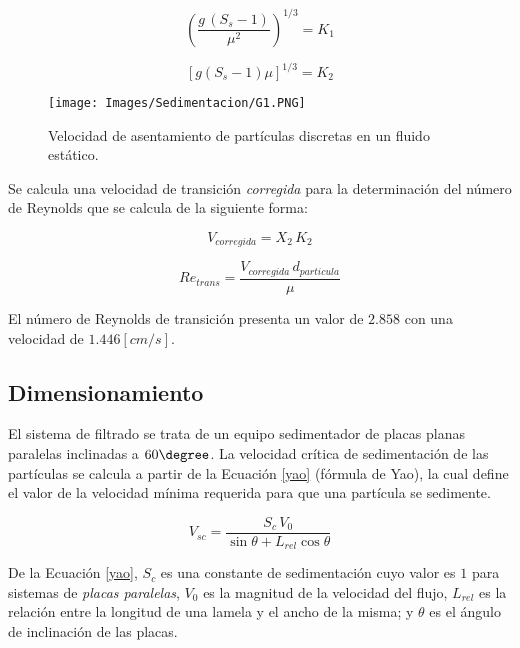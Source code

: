 \begin{equation*}
	\left( \frac{g \, (S_s-1)}{\mu ^2} \right) ^{1/3} = K_1
\end{equation*}

\begin{equation*}
	\left[ g (S_s-1) \mu \right] ^{1/3} = K_2
\end{equation*} 

\begin{figure}[h!]
	\centering
	\texttt{[image: Images/Sedimentacion/G1.PNG]}
	\caption{Velocidad de asentamiento de part\'iculas discretas en un fluido est\'atico.}
	\label{G1}
\end{figure}

\noindent
\justify

Se calcula una velocidad de transici\'on \textit{corregida} para la determinaci\'on del n\'umero de Reynolds que se calcula de la siguiente forma:

\begin{equation*}
	V_{corregida} = X_2 \, K_2
\end{equation*}

\begin{equation}
	Re_{trans} = \frac{V_{corregida} \, d_{particula}}{\mu}
\end{equation}

\noindent
\justify

El n\'umero de Reynolds de transici\'on presenta un valor de $2.858$ con una velocidad de $1.446 [cm/s]$.

\subsection{Dimensionamiento}

\noindent
\justify

El sistema de filtrado se trata de un equipo sedimentador de placas planas paralelas inclinadas a $60 \degree$. La velocidad cr\'itica de sedimentaci\'on de las part\'iculas se calcula a partir de la Ecuaci\'on \ref{yao} (f\'ormula de Yao), la cual define el valor de la velocidad m\'inima requerida para que una part\'icula se sedimente. 

\begin{equation}
	V_{sc} = \frac{S_c \, V_0}{\sin \theta + L_{rel} \cos \theta}
	\label{yao}
\end{equation}

\noindent
\justify

De la Ecuaci\'on \ref{yao}, $S_c$ es una constante de sedimentaci\'on cuyo valor es $1$ para sistemas de \textit{placas paralelas}, $V_0$ es la magnitud de la velocidad del flujo, $L_{rel}$ es la relaci\'on entre la longitud de una lamela y el ancho de la misma; y $\theta$ es el \'angulo de inclinaci\'on de las placas.

